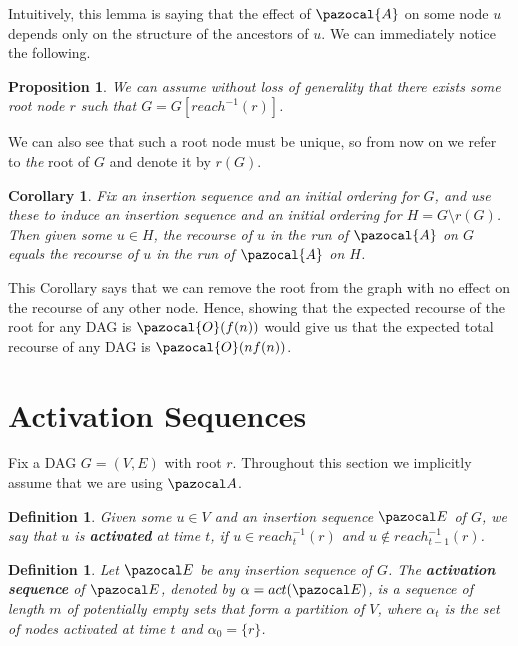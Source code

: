\documentclass{article}
\newtheorem{corollary}[theorem]{Corollary}
\newtheorem{proposition}[theorem]{Proposition}
\newtheorem{definition}[theorem]{Definition}
\begin{document}
Intuitively, this lemma is saying that the effect of $\pazocal{A}$ on some node $u$ depends only on the structure of the ancestors of $u$. We can immediately notice the following.

\begin{proposition}
We can assume without loss of generality that there exists some root node $r$ such that $G = G[reach^{-1}(r)]$.
\end{proposition}

We can also see that such a root node must be unique, so from now on we refer to \textit{the} root of $G$ and denote it by $r(G)$.

\begin{corollary}
Fix an insertion sequence and an initial ordering for $G$, and use these to induce an insertion sequence and an initial ordering for $H = G \setminus r(G)$. Then given some $u \in H$, the recourse of $u$ in the run of $\pazocal{A}$ on $G$ equals the recourse of $u$ in the run of $\pazocal{A}$ on $H$.
\end{corollary}

This Corollary says that we can remove the root from the graph with no effect on the recourse of any other node. Hence, showing that the expected recourse of the root for any DAG is $\pazocal{O}(f(n))$ would give us that the expected total recourse of any DAG is $\pazocal{O}(nf(n))$. 

\section{Activation Sequences}

Fix a DAG $G=(V,E)$ with root $r$. Throughout this section we implicitly assume that we are using $\pazocal A$.

\begin{definition}
Given some $u \in V$ and an insertion sequence $\pazocal E$ of $G$, we say that $u$ is \textbf{activated} at time $t$, if $u \in reach^{-1}_t(r)$ and $u \notin reach^{-1}_{t-1}(r)$.
\end{definition}

\begin{definition}
Let $\pazocal E$ be any insertion sequence of $G$. The \textbf{activation sequence} of $\pazocal E$, denoted by $\alpha = act(\pazocal E)$, is a sequence of length $m$ of potentially empty sets that form a partition of $V$, where $\alpha_t$ is the set of nodes activated at time $t$ and $\alpha_0 = \{r\}$.
\end{definition}
\end{document}
